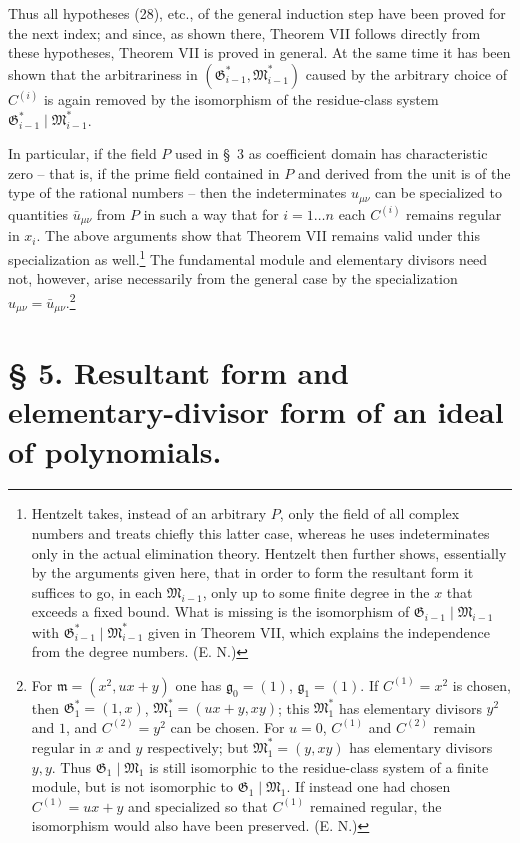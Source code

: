 \documentclass[11pt]{article}
\providecommand{\Gmod}{\mathfrak G}
\providecommand{\Mmod}{\mathfrak M}
\providecommand{\mideal}{\mathfrak m}
\providecommand{\gideal}{\mathfrak g}
\begin{document}
Thus all hypotheses (28), etc., of the general induction step have been proved for the next index; and since, as shown there, Theorem VII follows directly from these hypotheses, Theorem VII is proved in general. At the same time it has been shown that the arbitrariness in $(\Gmod^*_{i-1},\Mmod^*_{i-1})$ caused by the arbitrary choice of $C^{(i)}$ is again removed by the isomorphism of the residue-class system $\Gmod^*_{i-1}\mid\Mmod^*_{i-1}$.

In particular, if the field $P$ used in §~3 as coefficient domain has characteristic zero -- that is, if the prime field contained in $P$ and derived from the unit is of the type of the rational numbers -- then the indeterminates $u_{\mu\nu}$ can be specialized to quantities $\bar u_{\mu\nu}$ from $P$ in such a way that for $i=1\ldots n$ each $C^{(i)}$ remains regular in $x_i$. The above arguments show that Theorem VII remains valid under this specialization as well.\footnote{Hentzelt takes, instead of an arbitrary $P$, only the field of all complex numbers and treats chiefly this latter case, whereas he uses indeterminates only in the actual elimination theory. Hentzelt then further shows, essentially by the arguments given here, that in order to form the resultant form it suffices to go, in each $\Mmod_{i-1}$, only up to some finite degree in the $x$ that exceeds a fixed bound. What is missing is the isomorphism of $\Gmod_{i-1}\mid\Mmod_{i-1}$ with $\Gmod^*_{i-1}\mid\Mmod^*_{i-1}$ given in Theorem VII, which explains the independence from the degree numbers. (E. N.)} The fundamental module and elementary divisors need not, however, arise necessarily from the general case by the specialization $u_{\mu\nu}=\bar u_{\mu\nu}$.\footnote{For $\mideal=(x^2,ux+y)$ one has $\gideal_0=(1)$, $\gideal_1=(1)$. If $C^{(1)}=x^2$ is chosen, then $\Gmod_1^*=(1,x)$, $\Mmod_1^*=(ux+y,xy)$; this $\Mmod_1^*$ has elementary divisors $y^2$ and $1$, and $C^{(2)}=y^2$ can be chosen. For $u=0$, $C^{(1)}$ and $C^{(2)}$ remain regular in $x$ and $y$ respectively; but $\Mmod_1^*=(y,xy)$ has elementary divisors $y,y$. Thus $\Gmod_1\mid\Mmod_1$ is still isomorphic to the residue-class system of a finite module, but is not isomorphic to $\Gmod_1\mid\Mmod_1$. If instead one had chosen $C^{(1)}=ux+y$ and specialized so that $C^{(1)}$ remained regular, the isomorphism would also have been preserved. (E. N.)}

\section*{§ 5. Resultant form and elementary-divisor form of an ideal of polynomials.}
\end{document}
